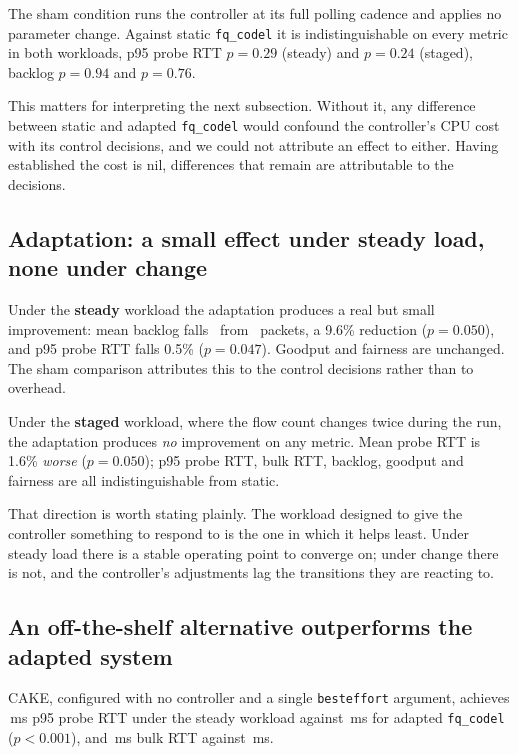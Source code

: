 The sham condition runs the controller at its full polling cadence and applies
no parameter change. Against static \texttt{fq\_codel} it is indistinguishable
on every metric in both workloads, p95 probe RTT $p=0.29$ (steady) and
$p=0.24$ (staged), backlog $p=0.94$ and $p=0.76$.

This matters for interpreting the next subsection. Without it, any difference
between static and adapted \texttt{fq\_codel} would confound the controller's
CPU cost with its control decisions, and we could not attribute an effect to
either. Having established the cost is nil, differences that remain are
attributable to the decisions.

\subsection{Adaptation: a small effect under steady load, none under change}

Under the \textbf{steady} workload the adaptation produces a real but small
improvement: mean backlog falls \FqCodelBacklogSteady\ from
\FqCodelAcapeBacklogSteady\ packets, a 9.6\% reduction ($p=0.050$), and p95
probe RTT falls 0.5\% ($p=0.047$). Goodput and fairness are unchanged. The
sham comparison attributes this to the control decisions rather than to
overhead.

Under the \textbf{staged} workload, where the flow count changes twice during
the run, the adaptation produces \emph{no} improvement on any metric. Mean
probe RTT is 1.6\% \emph{worse} ($p=0.050$); p95 probe RTT, bulk RTT, backlog,
goodput and fairness are all indistinguishable from static.

That direction is worth stating plainly. The workload designed to
give the controller something to respond to is the one in which it helps least.
Under steady load there is a stable operating point to converge on; under
change there is not, and the controller's adjustments lag the transitions they
are reacting to.

\subsection{An off-the-shelf alternative outperforms the adapted system}

CAKE, configured with no controller and a single \texttt{besteffort} argument,
achieves \CakeProbeRttPninetyfiveSteady\,ms p95 probe RTT under the steady
workload against \FqCodelAcapeProbeRttPninetyfiveSteady\,ms for adapted
\texttt{fq\_codel} ($p<0.001$), and \CakeBulkRttMeanSteady\,ms bulk RTT against
\FqCodelAcapeBulkRttMeanSteady\,ms.

